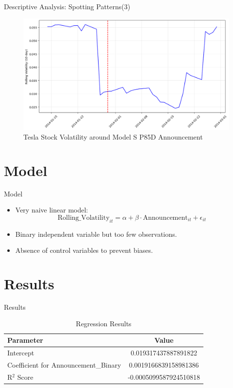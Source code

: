 \documentclass{beamer}
\begin{document}
\begin{frame}{Descriptive Analysis: Spotting Patterns(3)}
  
\begin{figure}
    \centering
    \includegraphics[width=0.8\linewidth]{TESLA_pattern.png}
    \caption{Tesla Stock Volatility around Model S P85D Announcement}
    \label{fig:TESLA_pattern}
\end{figure}
    
\end{frame}


\section{Model}

\begin{frame}{Model}
  \begin{itemize}
    \item Very naive linear model:
    \[
    \text{Rolling\_Volatility}_{it} = \alpha + \beta \cdot \text{Announcement}_{it} + \epsilon_{it}
    \]
    \item Binary independent variable but too few observations.
    \item Absence of control variables to prevent biases.
  \end{itemize}
\end{frame}


\section{Results}

\begin{frame}{Results}

  \begin{table}[ht]
    \centering
    \begin{tabular}{lc}
        \toprule
        \textbf{Parameter} & \textbf{Value} \\
        \midrule
        Intercept & 0.019317437887891822 \\
        Coefficient for Announcement\_Binary & 0.0019166839158981386 \\
        R\(^2\) Score & -0.0005099587924510818 \\
        \bottomrule
    \end{tabular}
    \caption{Regression Results}
    \label{tab:regression_outputs}
\end{table}

\end{frame}
\end{document}
